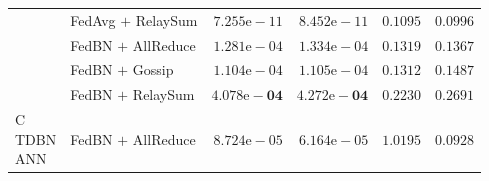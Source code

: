 \begin{table}[t]
\begin{tabular}{l l r r r r}
  & FedAvg $+$ RelaySum   & $7.255\mathrm{e}{-}11$ & $8.452\mathrm{e}{-}11$ & $0.1095$ & $0.0996$ \\
  & FedBN  $+$ AllReduce  & $1.281\mathrm{e}{-}04$ & $1.334\mathrm{e}{-}04$ & $0.1319$ & $0.1367$ \\
  & FedBN  $+$ Gossip     & $1.104\mathrm{e}{-}04$ & $1.105\mathrm{e}{-}04$ & $0.1312$ & $0.1487$ \\
  & FedBN  $+$ RelaySum   & $\mathbf{4.078\mathrm{e}{-}04}$ & $\mathbf{4.272\mathrm{e}{-}04}$ & $0.2230$ & $0.2691$ \\
\midrule
\shortstack[l]{C\\TDBN\\ANN}
  & FedBN $+$ AllReduce   & $8.724\mathrm{e}{-}05$ & $6.164\mathrm{e}{-}05$ & $1.0195$ & $0.0928$ \\
\bottomrule
\end{tabular}
\end{table}
